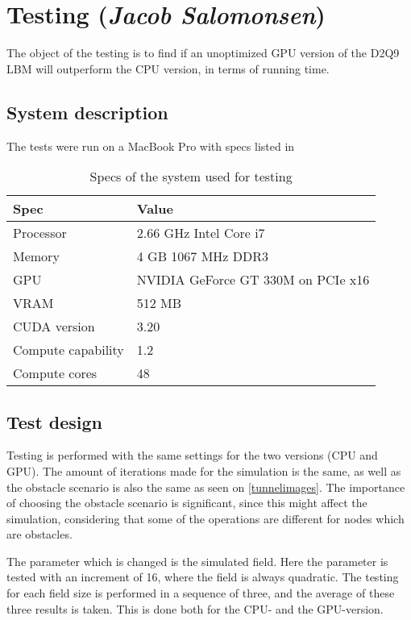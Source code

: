 \section{Testing (\textit{Jacob Salomonsen})}\label{sec:testing}
The object of the testing is to find if an unoptimized GPU version of the D2Q9 LBM will outperform the CPU version, in terms of running time.

\subsection{System description}
The tests were run on a MacBook Pro with specs listed in 

\begin{table}[htb]
	\centering
	\begin{tabular}{ll}
		\toprule
		Spec & Value \\
		\midrule
		Processor & 2.66 GHz Intel Core i7 \\
		Memory & 4 GB 1067 MHz DDR3 \\
		GPU & NVIDIA GeForce GT 330M on PCIe x16\\
		VRAM & 512 MB\\
		CUDA version & 3.20\\
		Compute capability & 1.2\\
		Compute cores & 48\\		
		\bottomrule
	\end{tabular}
	\caption{Specs of the system used for testing}
	\label{specs}
\end{table}

\subsection{Test design}
Testing is performed with the same settings for the two versions (CPU and GPU). The amount of iterations made for the simulation is the same, as well as the obstacle scenario is also the same as seen on \autoref{tunnelimages}. The importance of choosing the obstacle scenario is significant, since this might affect the simulation, considering that some of the operations are different for nodes which are obstacles.

The parameter which is changed is the simulated field. Here the parameter is tested with an increment of 16, where the field is always quadratic. The testing for each field size is performed in a sequence of three, and the average of these three results is taken. This is done both for the CPU- and the GPU-version.

